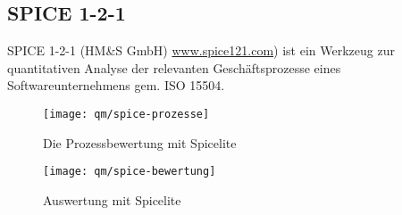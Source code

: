 \newpage
\subsection*{SPICE 1-2-1}
SPICE 1-2-1 (HM\&S GmbH)
\href{http://www.spice121.com}{www.spice121.com})
ist ein Werkzeug zur quantitativen
Analyse der relevanten Ge\-schäfts\-prozesse
eines Softwareunternehmens gem. ISO 15504.
%
\begin{figure}[H]
\begin{center}
\texttt{[image: qm/spice-prozesse]}
\end{center}
\caption{Die Prozessbewertung mit Spicelite}
\end{figure}
%
\begin{figure}[H]
\begin{center}
  \texttt{[image: qm/spice-bewertung]}
\end{center}
\caption{Auswertung mit Spicelite}
\end{figure}
\newpage
